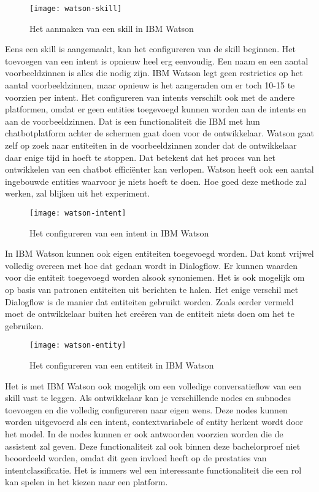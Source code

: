 \begin{figure}[H]
    \label{fig:watson-skill}
    \centering
    \texttt{[image: watson-skill]}
    \caption{Het aanmaken van een skill in IBM Watson}
\end{figure}

Eens een skill is aangemaakt, kan het configureren van de skill beginnen. Het toevoegen van een intent is opnieuw heel erg eenvoudig. Een naam en een aantal voorbeeldzinnen is alles die nodig zijn. IBM Watson legt geen restricties op het aantal voorbeeldzinnen, maar opnieuw is het aangeraden om er toch 10-15 te voorzien per intent. Het configureren van intents verschilt ook met de andere platformen, omdat er geen entities toegevoegd kunnen worden aan de intents en aan de voorbeeldzinnen. Dat is een functionaliteit die IBM met hun chatbotplatform achter de schermen gaat doen voor de ontwikkelaar. Watson gaat zelf op zoek naar entiteiten in de voorbeeldzinnen zonder dat de ontwikkelaar daar enige tijd in hoeft te stoppen. Dat betekent dat het proces van het ontwikkelen van een chatbot efficiënter kan verlopen. Watson heeft ook een aantal ingebouwde entities waarvoor je niets hoeft te doen. Hoe goed deze methode zal werken, zal blijken uit het experiment.

\begin{figure}[H]
    \label{fig:watson-intent}
    \centering
    \texttt{[image: watson-intent]}
    \caption{Het configureren van een intent in IBM Watson}
\end{figure}

In IBM Watson kunnen ook eigen entiteiten toegevoegd worden. Dat komt vrijwel volledig overeen met hoe dat gedaan wordt in Dialogflow. Er kunnen waarden voor die entiteit toegevoegd worden alsook synoniemen. Het is ook mogelijk om op basis van patronen entiteiten uit berichten te halen. Het enige verschil met Dialogflow is de manier dat entiteiten gebruikt worden. Zoals eerder vermeld moet de ontwikkelaar buiten het creëren van de entiteit niets doen om het te gebruiken.

\begin{figure}[H]
    \label{fig:watson-entity}
    \centering
    \texttt{[image: watson-entity]}
    \caption{Het configureren van een entiteit in IBM Watson}
\end{figure}

Het is met IBM Watson ook mogelijk om een volledige conversatieflow van een skill vast te leggen. Als ontwikkelaar kan je verschillende nodes en subnodes toevoegen en die volledig configureren naar eigen wens. Deze nodes kunnen worden uitgevoerd als een intent, contextvariabele of entity herkent wordt door het model. In de nodes kunnen er ook antwoorden voorzien worden die de assistent zal geven. Deze functionaliteit zal ook binnen deze bachelorproef niet beoordeeld worden, omdat dit geen invloed heeft op de prestaties van intentclassificatie. Het is immers wel een interessante functionaliteit die een rol kan spelen in het kiezen naar een platform.

